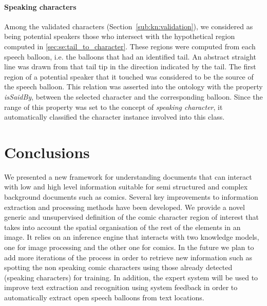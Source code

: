 \paragraph{Speaking characters} %
\label{sub:inference_of_the_speaking_characters}
Among the validated characters (Section~\ref{sub:kn:validation}), we considered as being potential speakers those who intersect with the hypothetical region computed in \ref{sec:se:tail_to_character}.
These regions were computed from each speech balloon, i.e. the balloons that had an identified tail.
An abstract straight line was drawn from that tail tip in the direction indicated by the tail.
The first region of a potential speaker that it touched was considered to be the source of the speech balloon.
This relation was asserted into the ontology with the property \textit{isSaidBy}, between the selected character and the corresponding balloon.
Since the range of this property was set to the concept of \textit{speaking character}, it automatically classified the character instance involved into this class.





\section{Conclusions}
\label{sec:kn:conclusion}

We presented a new framework for understanding documents that can interact with low and high level information suitable for semi structured and complex background documents such as comics.
Several key improvements to information extraction and processing methods have been developed. 
We provide a novel generic and unsupervised definition of the comic character region of interest that takes into account the spatial organisation of the rest of the elements in an image.
It relies on an inference engine that interacts with two knowledge models, one for image processing and the other one for comics.
In the future we plan to add more iterations of the process in order to retrieve new information such as spotting the non speaking comic characters using those already detected (speaking characters) for training.
In addition, the expert system will be used to improve text extraction and recognition using system feedback in order to automatically extract open speech balloons from text locations. 

